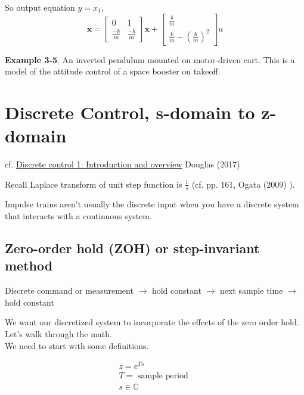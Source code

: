\documentclass[10pt]{amsart}
\begin{document}
\begin{multicols*}{2}
So output equation $y = x_1$,
\begin{equation}
\dot{\mathbf{x}} = \left[ \begin{matrix} 0 & 1 \\ \frac{-k}{m} & \frac{-b}{m} \end{matrix} \right] \mathbf{x} + \left[ \begin{matrix} \frac{b}{m} \\ \frac{k}{m} - \left( \frac{b}{m} \right)^2 \end{matrix} \right] u
\end{equation}

\textbf{Example 3-5}. An inverted pendulum mounted on motor-driven cart. This is a model of the attitude control of a space booster on takeoff.




\section{Discrete Control, s-domain to z-domain}

cf. \href{https://youtu.be/14cMhrp5wlk}{Discrete control 1: Introduction and overview} Douglas (2017) \cite{Doug2017}

Recall Laplace transform of unit step function is $\frac{1}{s}$ (cf. pp. 161, Ogata (2009) \cite{Ogat2009}).


Impulse trains aren't usually the discrete input when you have a discrete system that interacts with a continuous system.

\subsection{Zero-order hold (ZOH) or step-invariant method}

Discrete command or measurement $\to$ hold constant $\to$ next sample time $\to$ hold constant


We want our discretized system to incorporate the effects of the zero order hold. Let's walk through the math. \\
We need to start with some definitions.

\begin{equation}
	\begin{gathered}
		z = e^{Ts} \\
		T = \text{ sample period } \\
		s \in \mathbb{C}
	\end{gathered}
\end{equation}


\end{multicols*}
\end{document}
